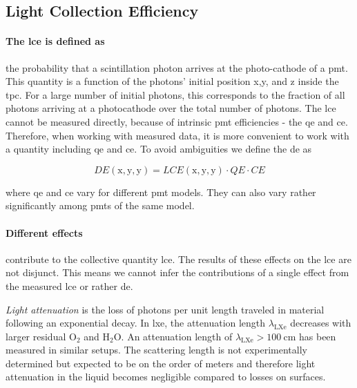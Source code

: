 
\FloatBarrier
\subsection{Light Collection Efficiency}
\label{ssec:lce}
\FloatBarrier



\paragraph{The \gls{lce} is defined as} the probability that a scintillation photon arrives at the photo-cathode of a \gls{pmt}.
This quantity is a function of the photons' initial position x,y, and z inside the \gls{tpc}.
For a large number of initial photons, this corresponds to the fraction of all photons arriving at a photocathode over the total number of photons.
The \gls{lce} cannot be measured directly, because of intrinsic \gls{pmt} efficiencies - the \gls{qe} and \gls{ce}.
Therefore, when working with measured data, it is more convenient to work with a quantity including \gls{qe} and \gls{ce}.
To avoid ambiguities we define the \gls{de} as


\begin{equation}
    \mathit{DE}\left(\mathrm{x}, \mathrm{y}, \mathrm{y}\right) =  \mathit{LCE}\left(\mathrm{x}, \mathrm{y}, \mathrm{y}\right) \cdot \mathit{QE} \cdot \mathit{CE}
\end{equation}

where \gls{qe} and \gls{ce} vary for different \gls{pmt} models.
They can also vary rather significantly among \glspl{pmt} of the same model.

\paragraph{Different effects} contribute to the collective quantity \gls{lce}.
The results of these effects on the \gls{lce} are not disjunct.
This means we cannot infer the contributions of a single effect from the measured \gls{lce} or rather \gls{de}.

\emph{Light attenuation} is the loss of photons per unit length traveled in material following an exponential decay.
In \gls{lxe}, the attenuation length $ \lambda_\mathrm{LXe} $ decreases with larger residual $ \mathrm{O}_2 $ and $ \mathrm{H}_2\mathrm{O} $.
An attenuation length of $ \lambda_\mathrm{LXe} > \SI{100}{\centi\m} $ has been measured in similar setups\cite{Baldini05}.
The scattering length is not experimentally determined but expected to be on the order of meters and therefore light attenuation in the liquid becomes negligible compared to losses on surfaces.

